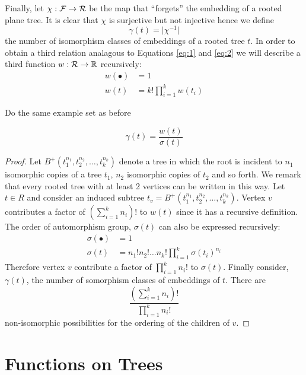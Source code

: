 Finally, let $\chi: \operatorname{\mathcal{F}} \rightarrow \operatorname{\mathcal{R}}$ be the map that ``forgets'' the embedding of a rooted plane tree.  It is clear that $\chi$ 
is surjective but not injective hence we define
\[
 \gamma(t) = \lvert \chi^{-1} \rvert 
\]
the number of isomorphism classes of embeddings of a rooted tree $t$.  In order to obtain a third relation analagous to Equations 
\ref{eq:1} and \ref{eq:2} we will describe a third function $w: \operatorname{\mathcal{R}} \rightarrow \mathbb{R}$ recursively:
\begin{align}
 w(\bullet) &= 1  \\ 
 w(t)  &= k!\prod_{i=1}^{k}w(t_i) 
\end{align}
\begin{ex}
 Do the same example set as before
\end{ex}

\begin{lem}
 \begin{equation}
  \gamma(t) = \frac{w(t)}{\sigma(t)}
 \end{equation}
\end{lem}
\begin{proof}
 Let $B^{+}(t_1^{n_1},t_2^{n_2},\dots,t_k^{n_k})$ denote a tree in which the root is incident to $n_1$ isomorphic copies 
 of a tree $t_1$, $n_2$ isomorphic copies of $t_2$ and so forth.  We remark that every rooted tree with at least 2 vertices can 
 be written in this way.  Let $t  \in R$ and consider an induced subtree $t_v = B^{+}(t_1^{n_1},t_2^{n_2},\dots,t_k^{n_k})$. 
 Vertex $v$ contributes a factor of $\left( \sum_{i=1}^k n_i \right)! $ to $w(t)$ since it has a recursive definition.  The order of 
 automorphism group, $\sigma(t)$ can also be expressed recursively:
 \begin{align}
  \sigma(\bullet) &= 1 \\
  \sigma(t) &= n_1 ! n_2! \dots n_k ! \prod_{i=1}^k\sigma(t_i)^{n_i} 
 \end{align}
Therefore vertex $v$ contribute a factor of $\prod_{i=1}^k n_i !$ to $\sigma(t)$.  Finally consider, $\gamma(t)$, the number of somorphism classes of embeddings of $t$.  
There are 
\[
 \frac{\left(\sum_{i=1}^k n_i \right)!}{\prod_{i=1}^k n_i!}
\]
non-isomorphic possibilities for the ordering of the children of $v$.
\end{proof}
\section{Functions on Trees}
